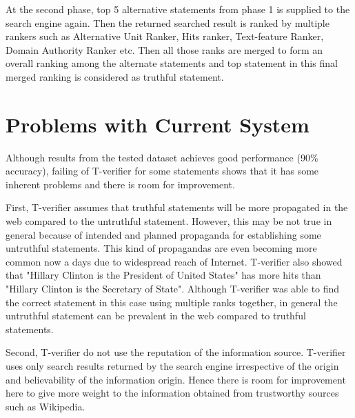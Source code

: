 \documentclass[11pt]{article}
\begin{document}
At the second phase, top 5 alternative statements from phase 1 is supplied to the search engine again. Then the returned searched result is ranked by multiple rankers such as Alternative Unit Ranker, Hits ranker, Text-feature Ranker, Domain Authority Ranker etc. Then all those ranks are merged to form an overall ranking among the alternate statements and top statement in this final merged ranking is considered as truthful statement. 

%
%
%



\section{Problems with Current System}
Although results from the tested dataset achieves good performance (90\% accuracy), failing of T-verifier for some statements shows that it has some inherent problems and there is room for improvement. 

First, T-verifier assumes that truthful statements will be more propagated in the web compared to the untruthful statement. However, this may be not true in general because of intended and planned propaganda for establishing some untruthful statements. This kind of propagandas are even becoming more common now a days due to widespread reach of Internet. T-verifier also showed that "Hillary Clinton is the President of United States" has more hits than "Hillary Clinton is the Secretary of State". Although T-verifier was able to find the correct statement in this case using multiple ranks together, in general the untruthful statement can be prevalent in the web compared to truthful statements. 

Second, T-verifier do not use the reputation of the information source. T-verifier uses only search results returned by the search engine irrespective of the origin and believability of the information origin. Hence there is room for improvement here to give more weight to the information obtained from trustworthy sources such as Wikipedia. 
\end{document}
